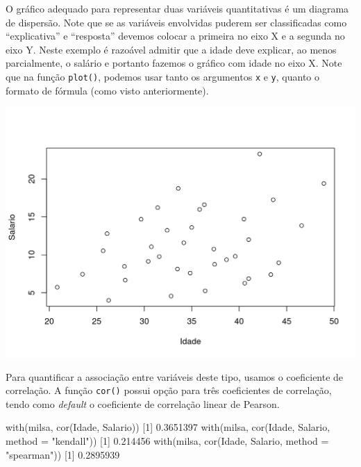 \documentclass[
  10pt,
  a4paper]{book}
\newenvironment{Shaded}{\begin{snugshade}}{\end{snugshade}}
\newcommand{\AttributeTok}[1]{\textcolor[rgb]{0.77,0.63,0.00}{#1}}
\newcommand{\DecValTok}[1]{\textcolor[rgb]{0.00,0.00,0.81}{#1}}
\newcommand{\FloatTok}[1]{\textcolor[rgb]{0.00,0.00,0.81}{#1}}
\newcommand{\FunctionTok}[1]{\textcolor[rgb]{0.00,0.00,0.00}{#1}}
\newcommand{\NormalTok}[1]{#1}
\newcommand{\SpecialCharTok}[1]{\textcolor[rgb]{0.00,0.00,0.00}{#1}}
\newcommand{\StringTok}[1]{\textcolor[rgb]{0.31,0.60,0.02}{#1}}
\begin{document}
O gráfico adequado para representar duas variáveis quantitativas é
um diagrama de dispersão. Note que se as variáveis envolvidas puderem
ser classificadas como ``explicativa'' e ``resposta'' devemos colocar a
primeira no eixo X e a segunda no eixo Y. Neste exemplo é razoável
admitir que a idade deve explicar, ao menos parcialmente, o salário e
portanto fazemos o gráfico com idade no eixo X. Note que na função
\texttt{plot()}, podemos usar tanto os argumentos \texttt{x} e \texttt{y}, quanto o formato
de fórmula (como visto anteriormente).

\begin{Shaded}
\end{Shaded}

\begin{center}\includegraphics{figures/unnamed-chunk-323-1} \end{center}

Para quantificar a associação entre variáveis deste tipo, usamos o
coeficiente de correlação. A função \texttt{cor()} possui opção para três
coeficientes de correlação, tendo como \emph{default} o coeficiente de
correlação linear de Pearson.

\begin{Shaded}
\begin{Highlighting}[]
\FunctionTok{with}\NormalTok{(milsa, }\FunctionTok{cor}\NormalTok{(Idade, Salario))}
\NormalTok{[}\DecValTok{1}\NormalTok{] }\FloatTok{0.3651397}
\FunctionTok{with}\NormalTok{(milsa, }\FunctionTok{cor}\NormalTok{(Idade, Salario, }\AttributeTok{method =} \StringTok{"kendall"}\NormalTok{))}
\NormalTok{[}\DecValTok{1}\NormalTok{] }\FloatTok{0.214456}
\FunctionTok{with}\NormalTok{(milsa, }\FunctionTok{cor}\NormalTok{(Idade, Salario, }\AttributeTok{method =} \StringTok{"spearman"}\NormalTok{))}
\NormalTok{[}\DecValTok{1}\NormalTok{] }\FloatTok{0.2895939}
\end{Highlighting}
\end{Shaded}
\end{document}
